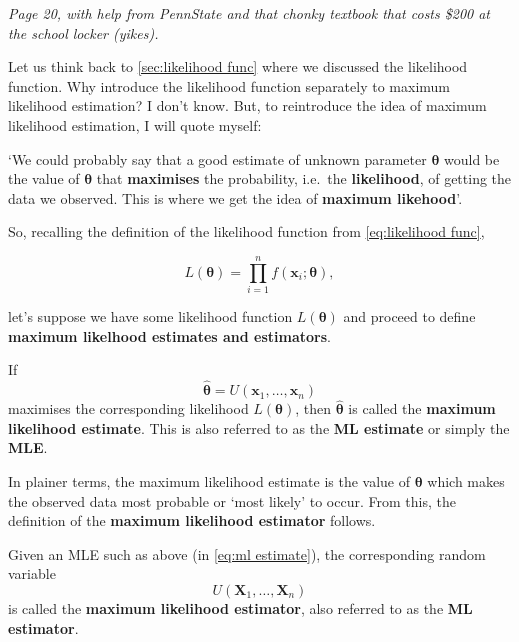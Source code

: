 \textit{Page 20, with help from PennState and that chonky textbook that costs \$200 at the school locker (yikes). \autocite{penn415} \autocite{rice}}

Let us think back to \cref{sec:likelihood func} where we discussed the likelihood function. 
Why introduce the likelihood function separately to maximum likelihood estimation? 
I don't know. But, to reintroduce the idea of maximum likelihood estimation, I will quote myself:

\bigskip

`We could probably say that a good estimate of unknown parameter \(\bm{\theta}\) would be the value of \(\bm{\theta}\) that \textbf{maximises} the probability, i.e.\ the \textbf{likelihood}, of getting the data we observed. 
This is where we get the idea of \textbf{maximum likehood}'.

\bigskip

So, recalling the definition of the likelihood function from \cref{eq:likelihood func}, 

\begin{equation*}
    L(\bm{\theta}) = \prod_{i=1}^n f(\bm{x}_i;\bm{\theta}),
\end{equation*}

let's suppose we have some likelihood function \(L(\bm{\theta})\) and proceed to define \textbf{maximum likelhood estimates and estimators}. 

\begin{definition}\label{defn:ml estimate}
    If 
    \begin{equation}\label{eq:ml estimate}
        \hat{\bm{\theta}} = U(\bm{x}_1,\ldots,\bm{x}_n)
    \end{equation}
    maximises the corresponding likelihood \(L(\bm{\theta})\), then \(\hat{\bm{\theta}}\) is called the \textbf{maximum likelihood estimate}.
    This is also referred to as the \textbf{ML estimate} or simply the \textbf{MLE}.
\end{definition}

In plainer terms, the maximum likelihood estimate is the value of \(\bm{\theta}\) which makes the observed data most probable or `most likely' to occur. \autocite{rice}
From this, the definition of the \textbf{maximum likelihood estimator} follows.

\begin{definition}\label{defn:ml estimator}
    Given an MLE such as above (in \cref{eq:ml estimate}), the corresponding random variable
    \begin{equation}\label{eq:ml estimator}
        U(\bm{X}_1,\ldots,\bm{X}_n)
    \end{equation}
    is called the \textbf{maximum likelihood estimator}, also referred to as the \textbf{ML estimator}.
\end{definition}

